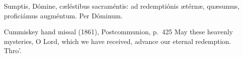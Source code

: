 Sumptis, Dómine, cæléstibus sacraméntis: ad redemptiónis ætérnæ, quæsumus,
proficiámus augméntum. Per Dóminum.
\finishfulltextelement
\begin{fulltextenglish}{Cummiskey hand missal (1861), Postcommunion, p.~425}
May these heavenly mysteries, O Lord, which we have received, advance our
eternal redemption. Thro'.
\end{fulltextenglish}
